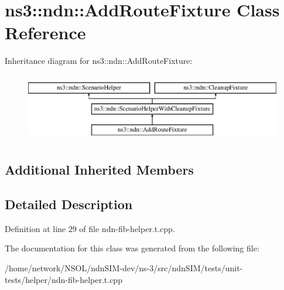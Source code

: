 \hypertarget{classns3_1_1ndn_1_1AddRouteFixture}{}\section{ns3\+:\+:ndn\+:\+:Add\+Route\+Fixture Class Reference}
\label{classns3_1_1ndn_1_1AddRouteFixture}
Inheritance diagram for ns3\+:\+:ndn\+:\+:Add\+Route\+Fixture\+:\begin{figure}[H]
\begin{center}
\leavevmode
\includegraphics[height=3.000000cm]{classns3_1_1ndn_1_1AddRouteFixture}
\end{center}
\end{figure}
\subsection*{Additional Inherited Members}


\subsection{Detailed Description}


Definition at line 29 of file ndn-\/fib-\/helper.\+t.\+cpp.



The documentation for this class was generated from the following file\+:\begin{DoxyCompactItemize}
\item 
/home/network/\+N\+S\+O\+L/ndn\+S\+I\+M-\/dev/ns-\/3/src/ndn\+S\+I\+M/tests/unit-\/tests/helper/ndn-\/fib-\/helper.\+t.\+cpp\end{DoxyCompactItemize}
